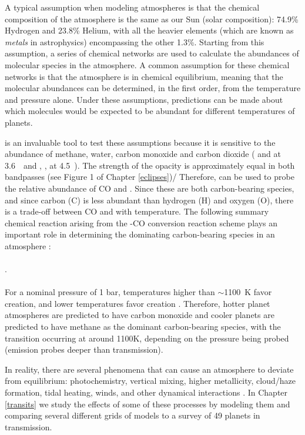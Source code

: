 A typical assumption when modeling atmospheres is that the chemical composition of the atmosphere is the same as our Sun (solar composition): 74.9\% Hydrogen and 23.8\% Helium, with all the heavier elements (which are known as \textit{metals} in astrophysics) encompassing the other 1.3\%. Starting from this assumption, a series of chemical networks are used to calculate the abundances of molecular species in the atmosphere. A common assumption for these chemical networks is that the atmosphere is in chemical equilibrium, meaning that the molecular abundances can be determined, in the first order, from the temperature and pressure alone. Under these assumptions, predictions can be made about which molecules would be expected to be abundant for different temperatures of planets.

\spitzer is an invaluable tool to test these assumptions because it is sensitive to the abundance of methane, water, carbon monoxide and carbon dioxide ( and  at 3.6~\um~and , ,  at 4.5~\um). The strength of the  opacity is approximately equal in both \spitzerIRAC bandpasses (see Figure 1 of Chapter \ref{eclipses})/ Therefore, \spitzer can be used to probe the relative abundance of CO and  \citep{Madhusudhan2019}. Since these are both carbon-bearing species, and since carbon (C) is less abundant than hydrogen (H) and oxygen (O), there is a trade-off between CO and  with temperature. The following summary chemical reaction arising from the -CO conversion reaction scheme plays an important role in determining the dominating carbon-bearing species in an atmosphere \citep[e.g.,][]{Visscher2010, Moses2011, Visscher2011}:
\\
\\
.
\\
\\
For a nominal pressure of 1 bar, temperatures higher than $\sim$1100~K favor  creation, and lower temperatures favor  creation \citep[e.g.][]{Madhusudhan2012, Molliere2015, Molaverdikhani2019}. Therefore, hotter planet atmospheres are predicted to have carbon monoxide and cooler planets are predicted to have methane as the dominant carbon-bearing species, with the transition occurring at around 1100K, depending on the pressure being probed (emission probes deeper than transmission).

In reality, there are several phenomena that can cause an atmosphere to deviate from equilibrium: photochemistry, vertical mixing, higher metallicity, cloud/haze formation, tidal heating, winds, and other dynamical interactions \citep[e.g.,][]{Madhusudhan2019}. In Chapter \ref{transits} we study the effects of some of these processes by modeling them and comparing several different grids of models to a survey of 49 planets in transmission.


